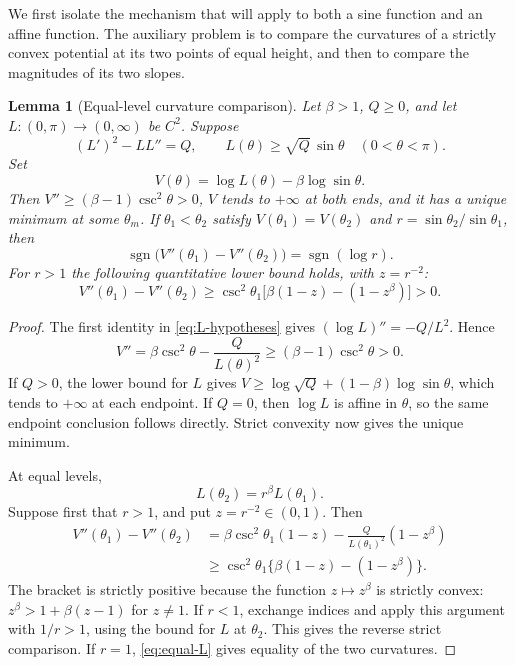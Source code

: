 \documentclass[11pt,a4paper]{article}
\newtheorem{lemma}[theorem]{Lemma}
\theoremstyle{definition}
\theoremstyle{remark}
\numberwithin{equation}{section}
\newcommand{\sign}{\operatorname{sgn}}
\begin{document}
We first isolate the mechanism that will apply to both a sine function
and an affine function. The auxiliary problem is to compare the
curvatures of a strictly convex potential at its two points of equal
height, and then to compare the magnitudes of its two slopes.

\begin{lemma}[Equal-level curvature comparison]\label{lem:curvature}
Let $\beta>1$, $Q\ge0$, and let $L:(0,\pi)\to(0,\infty)$ be $C^2$.
Suppose
\begin{equation}\label{eq:L-hypotheses}
 (L')^2-LL''=Q,\qquad
 L(\theta)\ge\sqrt Q\,\sin\theta\quad(0<\theta<\pi).
\end{equation}
Set
\begin{equation}\label{eq:V-general}
 V(\theta)=\log L(\theta)-\beta\log\sin\theta .
\end{equation}
Then $V''\ge(\beta-1)\csc^2\theta>0$, $V$ tends to $+\infty$
at both ends, and it has a unique minimum at some $\theta_m$.
If $\theta_1<\theta_2$ satisfy $V(\theta_1)=V(\theta_2)$ and
$r=\sin\theta_2/\sin\theta_1$, then
\begin{equation}\label{eq:curvature-sign}
 \sign\bigl(V''(\theta_1)-V''(\theta_2)\bigr)=\sign(\log r).
\end{equation}
For $r>1$ the following quantitative lower bound holds, with $z=r^{-2}$:
\begin{equation}\label{eq:key-gap}
 V''(\theta_1)-V''(\theta_2)
 \ge \csc^2\theta_1
       \bigl[\beta(1-z)-(1-z^\beta)\bigr]>0.
\end{equation}
\end{lemma}

\begin{proof}
The first identity in \eqref{eq:L-hypotheses} gives
$(\log L)''=-Q/L^2$. Hence
\begin{equation}\label{eq:general-convexity}
 V''=\beta\csc^2\theta-\frac{Q}{L(\theta)^2}
 \ge(\beta-1)\csc^2\theta>0.
\end{equation}
If $Q>0$, the lower bound for $L$ gives
$V\ge\log\sqrt Q+(1-\beta)\log\sin\theta$, which tends to
$+\infty$ at each endpoint. If $Q=0$, then $\log L$ is affine
in $\theta$, so the same endpoint conclusion follows directly.
Strict convexity now gives the unique minimum.

At equal levels,
\begin{equation}\label{eq:equal-L}
 L(\theta_2)=r^\beta L(\theta_1).
\end{equation}
Suppose first that $r>1$, and put $z=r^{-2}\in(0,1)$. Then
\begin{align*}
 V''(\theta_1)-V''(\theta_2)
 &=
 \beta\csc^2\theta_1(1-z)
 -\frac{Q}{L(\theta_1)^2}(1-z^\beta)\\
 &\ge
 \csc^2\theta_1\{\beta(1-z)-(1-z^\beta)\}.
\end{align*}
The bracket is strictly positive because the function $z\mapsto z^\beta$
is strictly convex:
$z^\beta>1+\beta(z-1)$ for $z\ne1$.
If $r<1$, exchange indices and apply this argument with $1/r>1$,
using the bound for $L$ at $\theta_2$. This gives the reverse strict
comparison. If $r=1$, \eqref{eq:equal-L} gives equality of the two
curvatures.
\end{proof}
\end{document}
